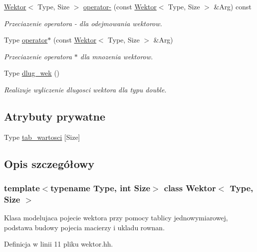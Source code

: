 \begin{DoxyCompactItemize}
\hyperlink{class_wektor}{Wektor}$<$ Type, Size $>$ \hyperlink{class_wektor_a8c00cfdd29bddc4115ba1285112bf62f}{operator-\/} (const \hyperlink{class_wektor}{Wektor}$<$ Type, Size $>$ \&Arg) const
\begin{DoxyCompactList}\small\item\em Przeciazenie operatora -\/ dla odejmowania wektorow. \end{DoxyCompactList}\item 
Type \hyperlink{class_wektor_ab786f148ed27e5af9cb64fbc1efcc8d0}{operator$\ast$} (const \hyperlink{class_wektor}{Wektor}$<$ Type, Size $>$ \&Arg)
\begin{DoxyCompactList}\small\item\em Przeciazenie operatora $\ast$ dla mnozenia wektorow. \end{DoxyCompactList}\item 
Type \hyperlink{class_wektor_a7a7ef7322f231052fc83b2b4b1954399}{dlug\+\_\+wek} ()
\begin{DoxyCompactList}\small\item\em Realizuje wyliczenie dlugosci wektora dla typu double. \end{DoxyCompactList}\end{DoxyCompactItemize}
\subsection*{Atrybuty prywatne}
\begin{DoxyCompactItemize}
\item 
Type \hyperlink{class_wektor_ab2e838853fc88319f5eb21e35490b174}{tab\+\_\+wartosci} \mbox{[}Size\mbox{]}
\end{DoxyCompactItemize}


\subsection{Opis szczegółowy}
\subsubsection*{template$<$typename Type, int Size$>$\newline
class Wektor$<$ Type, Size $>$}

Klasa modelujaca pojecie wektora przy pomocy tablicy jednowymiarowej, podstawa budowy pojecia macierzy i ukladu rownan. 

Definicja w linii 11 pliku wektor.\+hh.



